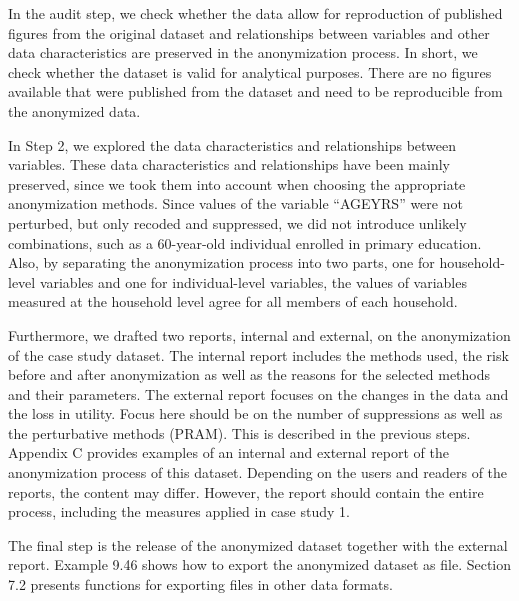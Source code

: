 \documentclass[letterpaper,10pt,english]{sphinxmanual}
\begin{document}

In the audit step, we check whether the data allow for reproduction of
published figures from the original dataset and relationships between
variables and other data characteristics are preserved in the
anonymization process. In short, we check whether the dataset is valid
for analytical purposes. There are no figures available that were
published from the dataset and need to be reproducible from the
anonymized data.

In Step 2, we explored the data characteristics and relationships
between variables. These data characteristics and relationships have
been mainly preserved, since we took them into account when choosing the
appropriate anonymization methods. Since values of the variable “AGEYRS”
were not perturbed, but only recoded and suppressed, we did not
introduce unlikely combinations, such as a 60-year-old individual
enrolled in primary education. Also, by separating the anonymization
process into two parts, one for household-level variables and one for
individual-level variables, the values of variables measured at the
household level agree for all members of each household.

Furthermore, we drafted two reports, internal and external, on the
anonymization of the case study dataset. The internal report includes
the methods used, the risk before and after anonymization as well as the
reasons for the selected methods and their parameters. The external
report focuses on the changes in the data and the loss in utility. Focus
here should be on the number of suppressions as well as the perturbative
methods (PRAM). This is described in the previous steps. 
Appendix C provides examples of an internal and external report of the
anonymization process of this dataset. Depending on the users and
readers of the reports, the content may differ.   However, the
report should contain the entire process, including the measures applied
in case study 1.


The final step is the release of the anonymized dataset together with
the external report. Example 9.46 shows how to export the anonymized
dataset as  file. Section 7.2 presents functions for exporting
files in other data formats.
\end{document}
